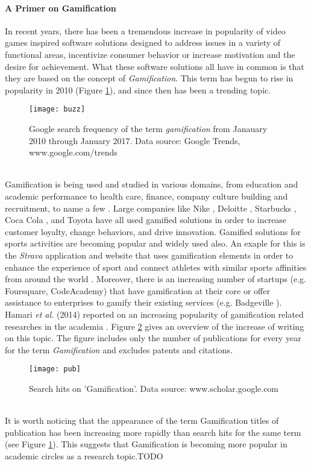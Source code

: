 \paragraph{A Primer on Gamification}
In recent years, there has been a tremendous increase in popularity of video games inspired software solutions designed to address issues in a variety of functional areas, incentivize consumer behavior or increase motivation and the desire for achievement. What these software solutions all have in common is that they are based on the concept of \textit{Gamification}. This term has begun to rise in popularity in 2010 (Figure \ref{fig:buzz}), and since then has been a trending topic. %
\begin{figure}[h]
    \centering
    \texttt{[image: buzz]}
    \caption{Google search frequency of the term \textit{gamification} from Janauary 2010 through January 2017. Data source: Google Trends, www.google.com/trends}
    \label{fig:buzz}
\end{figure}\\
Gamification is being used and studied in various domains, from education and academic performance to health care, finance, company culture building and recruitment, to name a few \cite{gamificationExamples, gamificationWiki, enterpriseGamify}. Large companies like Nike \cite{nikePlus}, Deloitte \cite{deloitte}, Starbucks \cite{starbucks}, Coca Cola \cite{coke}, and Toyota \cite{toyota} have all used gamified solutions in order to increase customer loyalty, change behaviors, 
and drive innovation. Gamified solutions for sports activities are becoming popular and widely used also. An exaple for this is the \textit{Strava} application and website that uses gamification elements in order to enhance the experience of sport and connect athletes with similar sports affinities from around the world \cite{strava}. %
Moreover, there is an increasing number of startups (e.g. Foursquare, CodeAcademy) that have gamification  at  their  core \cite{codeacademy} or offer assistance to enterprises to gamify their existing services (e.g. Badgeville \cite{badgeville}). Hamari \textit{et al.} (2014) reported on an increasing popularity of gamification related researches in the academia \cite{hamari2014does}. Figure \ref{fig:pub} gives an overview of the increase of writing on this topic. The figure includes only the number of publications for every year for the term \textit{Gamification} and excludes patents and citations. 
\begin{figure}[h]
    \centering
    \texttt{[image: pub]}
    \caption{Search hits on 'Gamification'. Data source: www.scholar.google.com}
    \label{fig:pub}
\end{figure}\\
It is worth noticing that the appearance of the term Gamification titles of publication has been increasing more rapidly than search hits for the same term (see Figure \ref{fig:buzz}). This suggests that Gamification is becoming more popular in academic circles as a research topic.TODO%
